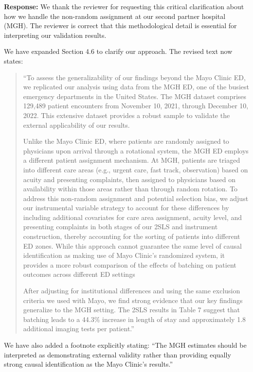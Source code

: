 \documentclass[11pt]{article}
\newcommand{\1}{\hbox{\rm 1\kern-.35em 1}}
\begin{document}
\noindent\textbf{Response:} \color{blue} We thank the reviewer for requesting this critical clarification about how we handle the non-random assignment at our second partner hospital (MGH). The reviewer is correct that this methodological detail is essential for interpreting our validation results.

We have expanded Section 4.6 to clarify our approach. The revised text now states:

\begin{quote}
    ``To assess the generalizability of our findings beyond the Mayo Clinic ED, we replicated our analysis using data from the MGH ED, one of the busiest emergency departments in the United States. The MGH dataset comprises 129,489 patient encounters from November 10, 2021, through December 10, 2022. This extensive dataset provides a robust sample to validate the external applicability of our results.
    
  Unlike the Mayo Clinic ED, where patients are randomly assigned to physicians upon arrival through a rotational system, the MGH ED employs a different patient assignment mechanism. At MGH, patients are triaged into different care areas (e.g., urgent care, fast track, observation) based on acuity and presenting complaints, then assigned to physicians based on availability within those areas rather than through random rotation. To address this non-random assignment and potential selection bias, we adjust our instrumental variable strategy to account for these differences by including additional covariates for care area assignment, acuity level, and presenting complaints in both stages of our 2SLS and instrument construction, thereby accounting for the sorting of patients into different ED zones. While this approach cannot guarantee the same level of causal identification as making use of Mayo Clinic's randomized system, it provides a more robust comparison of the effects of batching on patient outcomes across different ED settings
    
  After adjusting for institutional differences and using the same exclusion criteria we used with Mayo, we find strong evidence that our key findings generalize to the MGH setting. The 2SLS results in Table 7 suggest that batching leads to a 44.3\% increase in length of stay and approximately 1.8 additional imaging tests per patient.''
\end{quote}

We have also added a footnote explicitly stating: ``The MGH estimates should be interpreted as demonstrating external validity rather than providing equally strong causal identification as the Mayo Clinic's results.''
\end{document}

